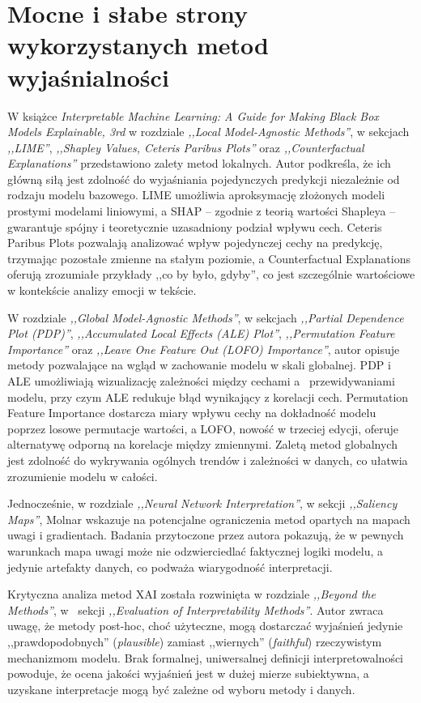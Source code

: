 \documentclass[wmii, inf, mgr]{uwmthesis}
\begin{document}
\section{Mocne i słabe strony wykorzystanych metod wyjaśnialności}
W książce \textit{Interpretable Machine Learning: A Guide for Making Black Box Models Explainable, 3rd} \cite{SHAP} w rozdziale \textit{,,Local Model-Agnostic Methods''}, w sekcjach \textit{,,LIME''}, \textit{,,Shapley Values, Ceteris Paribus Plots''} oraz \textit{,,Counterfactual Explanations''} przedstawiono zalety metod lokalnych. Autor podkreśla, że ich główną siłą jest zdolność do wyjaśniania pojedynczych predykcji niezależnie od rodzaju modelu bazowego. LIME umożliwia aproksymację złożonych modeli prostymi modelami liniowymi, a SHAP -- zgodnie z teorią wartości Shapleya -- gwarantuje spójny i teoretycznie uzasadniony podział wpływu cech. Ceteris Paribus Plots pozwalają analizować wpływ pojedynczej cechy na predykcję, trzymając pozostałe zmienne na stałym poziomie, a Counterfactual Explanations oferują zrozumiałe przykłady ,,co by było, gdyby'', co jest szczególnie wartościowe w kontekście analizy emocji w tekście.

W rozdziale \textit{,,Global Model-Agnostic Methods''}, w sekcjach \textit{,,Partial Dependence Plot (PDP)''}, \textit{,,Accumulated Local Effects (ALE) Plot''}, \textit{,,Permutation Feature Importance''} oraz \textit{,,Leave One Feature Out (LOFO) Importance''}, autor opisuje metody pozwalające na wgląd w zachowanie modelu w skali globalnej. PDP i ALE umożliwiają wizualizację zależności między cechami a~ przewidywaniami modelu, przy czym ALE redukuje błąd wynikający z korelacji cech. Permutation Feature Importance dostarcza miary wpływu cechy na dokładność modelu poprzez losowe permutacje wartości, a LOFO, nowość w trzeciej edycji, oferuje alternatywę odporną na korelacje między zmiennymi. Zaletą metod globalnych jest zdolność do wykrywania ogólnych trendów i zależności w danych, co ułatwia zrozumienie modelu w całości.

Jednocześnie, w rozdziale \textit{,,Neural Network Interpretation''}, w sekcji \textit{,,Saliency Maps''}, Molnar wskazuje na potencjalne ograniczenia metod opartych na mapach uwagi i gradientach. Badania przytoczone przez autora pokazują, że w pewnych warunkach mapa uwagi może nie odzwierciedlać faktycznej logiki modelu, a jedynie artefakty danych, co podważa wiarygodność interpretacji.

Krytyczna analiza metod XAI została rozwinięta w rozdziale \textit{,,Beyond the Methods''}, w~ sekcji \textit{,,Evaluation of Interpretability Methods''}. Autor zwraca uwagę, że metody post-hoc, choć użyteczne, mogą dostarczać wyjaśnień jedynie ,,prawdopodobnych'' (\textit{plausible}) zamiast ,,wiernych'' (\textit{faithful}) rzeczywistym mechanizmom modelu. Brak formalnej, uniwersalnej definicji interpretowalności powoduje, że ocena jakości wyjaśnień jest w dużej mierze subiektywna, a~ uzyskane interpretacje mogą być zależne od wyboru metody i danych.
\end{document}
